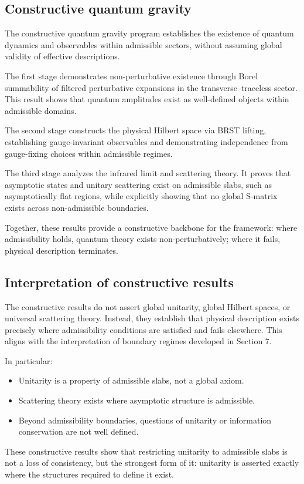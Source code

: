 \documentclass[11pt]{article}
\begin{document}
\subsection{Constructive quantum gravity}

The constructive quantum gravity program establishes the existence of quantum dynamics and observables within admissible sectors, without assuming global validity of effective descriptions.

The first stage demonstrates non-perturbative existence through Borel summability of filtered perturbative expansions in the transverse--traceless sector. This result shows that quantum amplitudes exist as well-defined objects within admissible domains.

The second stage constructs the physical Hilbert space via BRST lifting, establishing gauge-invariant observables and demonstrating independence from gauge-fixing choices within admissible regimes.

The third stage analyzes the infrared limit and scattering theory. It proves that asymptotic states and unitary scattering exist on admissible slabs, such as asymptotically flat regions, while explicitly showing that no global S-matrix exists across non-admissible boundaries.

Together, these results provide a constructive backbone for the framework: where admissibility holds, quantum theory exists non-perturbatively; where it fails, physical description terminates.

\subsection{Interpretation of constructive results}

The constructive results do not assert global unitarity, global Hilbert spaces, or universal scattering theory. Instead, they establish that physical description exists precisely where admissibility conditions are satisfied and fails elsewhere. This aligns with the interpretation of boundary regimes developed in Section 7.

In particular:
\begin{itemize}
\item Unitarity is a property of admissible slabs, not a global axiom.
\item Scattering theory exists where asymptotic structure is admissible.
\item Beyond admissibility boundaries, questions of unitarity or information conservation are not well defined.
\end{itemize}
These constructive results show that restricting unitarity to admissible slabs is not a loss of consistency,
but the strongest form of it: unitarity is asserted exactly where the structures required to define it exist.
\end{document}
